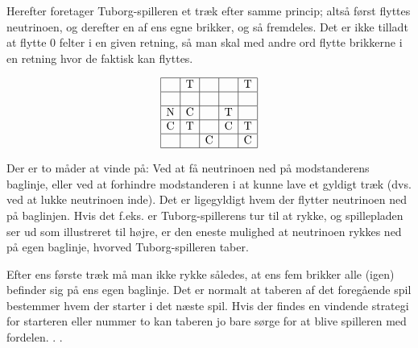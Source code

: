 \bigskip
Herefter foretager Tuborg-spilleren et træk efter samme princip; altså først flyttes neutrinoen, og derefter en af ens egne brikker, og så fremdeles. Det er ikke tilladt at flytte 0 felter i en given retning, så man skal med andre ord flytte brikkerne i en retning hvor de faktisk kan flyttes. 

\begin{figure}
	\[
	\begin{array}{|c|c|c|c|c|}
		\hline
		& \text{T} &  &  & \text{T} \\ 
		\hline
		&    &     &  &     \\ 
		\hline
		\text{N} & \text{C}  &  &  \text{T}	  &      \\ 
		\hline
		\text{C} & \text{T}   &    &  \text{C}   &  \text{T}   \\ 
		\hline
		&  & \text{C} &  & \text{C} \\ 
		\hline
	\end{array}
	\]
\end{figure}
Der er to måder at vinde på: Ved at få neutrinoen ned på modstanderens baglinje, eller ved at forhindre modstanderen i at kunne lave et gyldigt træk (dvs. ved at lukke neutrinoen inde). Det er ligegyldigt hvem der flytter neutrinoen ned på baglinjen. Hvis det f.eks. er Tuborg-spillerens tur til at rykke, og spillepladen ser ud som illustreret til højre, er den eneste mulighed at neutrinoen rykkes ned på egen baglinje, hvorved Tuborg-spilleren taber.


Efter ens første træk må man ikke rykke således, at ens fem brikker alle (igen) befinder sig på ens egen baglinje. Det er normalt at taberen af det foregående spil bestemmer hvem der starter i det næste spil. Hvis der findes en vindende strategi for starteren eller nummer to kan taberen jo bare sørge for at blive spilleren med fordelen. . .